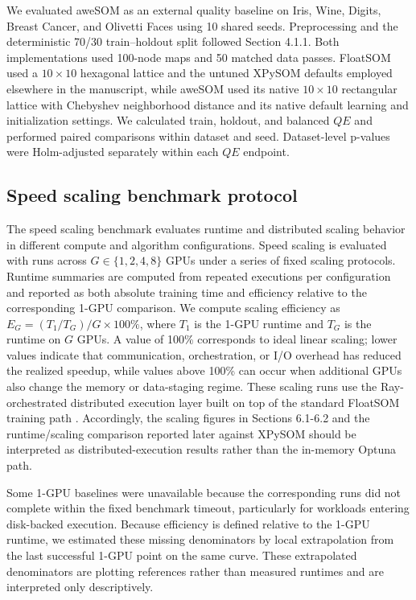 \documentclass[10pt]{article} %
\begin{document}
We evaluated aweSOM as an external quality baseline on Iris, Wine, Digits, Breast Cancer, and Olivetti Faces using 10 shared seeds. Preprocessing and the deterministic 70/30 train--holdout split followed Section 4.1.1. Both implementations used 100-node maps and 50 matched data passes. FloatSOM used a $10\times10$ hexagonal lattice and the untuned XPySOM defaults employed elsewhere in the manuscript, while aweSOM used its native $10\times10$ rectangular lattice with Chebyshev neighborhood distance and its native default learning and initialization settings. We calculated train, holdout, and balanced $QE$ and performed paired comparisons within dataset and seed. Dataset-level p-values were Holm-adjusted separately within each $QE$ endpoint.

\subsection{Speed scaling benchmark protocol}

The speed scaling benchmark evaluates runtime and distributed scaling behavior in different compute and algorithm configurations. Speed scaling is evaluated with runs across $G\in\{1,2,4,8\}$ GPUs under a series of fixed scaling protocols. Runtime summaries are computed from repeated executions per configuration and reported as both absolute training time and efficiency relative to the corresponding 1-GPU comparison. We compute scaling efficiency as $E_G=(T_1/T_G)/G \times 100\%$, where $T_1$ is the 1-GPU runtime and $T_G$ is the runtime on $G$ GPUs. A value of 100\% corresponds to ideal linear scaling; lower values indicate that communication, orchestration, or I/O overhead has reduced the realized speedup, while values above 100\% can occur when additional GPUs also change the memory or data-staging regime. These scaling runs use the Ray-orchestrated distributed execution layer built on top of the standard FloatSOM training path \citep{moritzRayDistributedFramework2018}. Accordingly, the scaling figures in Sections 6.1-6.2 and the runtime/scaling comparison reported later against XPySOM should be interpreted as distributed-execution results rather than the in-memory Optuna path.

Some 1-GPU baselines were unavailable because the corresponding runs did not complete within the fixed benchmark timeout, particularly for workloads entering disk-backed execution. Because efficiency is defined relative to the 1-GPU runtime, we estimated these missing denominators by local extrapolation from the last successful 1-GPU point on the same curve. These extrapolated denominators are plotting references rather than measured runtimes and are interpreted only descriptively.
\end{document}
